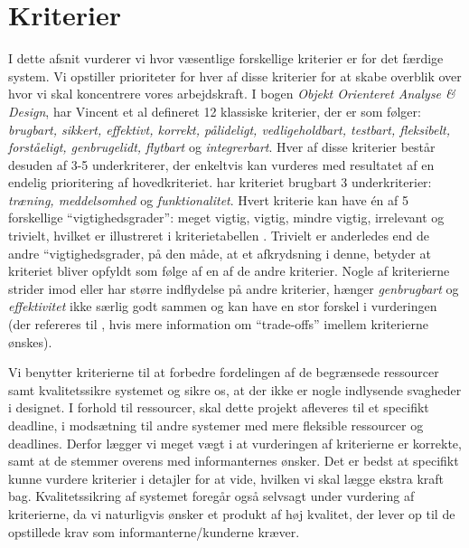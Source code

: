 \section{Kriterier}
\label{sec:kriterier}

I dette afsnit vurderer vi hvor væsentlige forskellige kriterier er for det færdige system. Vi opstiller prioriteter for hver af disse kriterier for at skabe overblik over hvor vi skal koncentrere vores arbejdskraft. I bogen \emph{Objekt Orienteret Analyse \& Design}\cite{ooad}, har Vincent et al defineret 12 klassiske kriterier, der er som følger: \emph{brugbart, sikkert, effektivt, korrekt, pålideligt, vedligeholdbart, testbart, fleksibelt, forståeligt, genbrugelidt, flytbart} og \emph{integrerbart}. Hver af disse kriterier består desuden af 3-5 underkriterer, der enkeltvis kan vurderes med resultatet af en endelig prioritering af hovedkriteriet. \Fx har kriteriet brugbart 3 underkriterier: \emph{træning, meddelsomhed} og \emph{funktionalitet}. 
Hvert kriterie kan have én af 5 forskellige ``vigtighedsgrader'': meget vigtig, vigtig, mindre vigtig, irrelevant og trivielt, hvilket er illustreret i kriterietabellen . Trivielt er anderledes end de andre ``vigtighedsgrader, på den måde, at et afkrydsning i denne, betyder at kriteriet bliver opfyldt som følge af en af de andre kriterier. 
Nogle af kriterierne strider imod eller har større indflydelse på andre kriterier, \fx hænger \emph{genbrugbart} og \emph{effektivitet} ikke særlig godt sammen og kan have en stor forskel i vurderingen (der refereres til \cite[s.~18]{crit}, hvis mere information om ``trade-offs'' imellem kriterierne ønskes).



Vi benytter kriterierne til at forbedre fordelingen af de begrænsede ressourcer samt kvalitetssikre systemet og sikre os, at der ikke er nogle indlysende svagheder i designet. I forhold til ressourcer, skal dette projekt afleveres til et specifikt deadline, i modsætning til andre systemer med mere fleksible ressourcer og deadlines. Derfor lægger vi meget vægt i at vurderingen af kriterierne er korrekte, samt at de stemmer overens med informanternes ønsker. Det er bedst at specifikt kunne vurdere kriterier i detajler for at vide, hvilken vi skal lægge ekstra kraft bag. Kvalitetssikring af systemet foregår også selvsagt under vurdering af kriterierne, da vi naturligvis ønsker et produkt af høj kvalitet, der lever op til de opstillede krav som informanterne/kunderne kræver.

